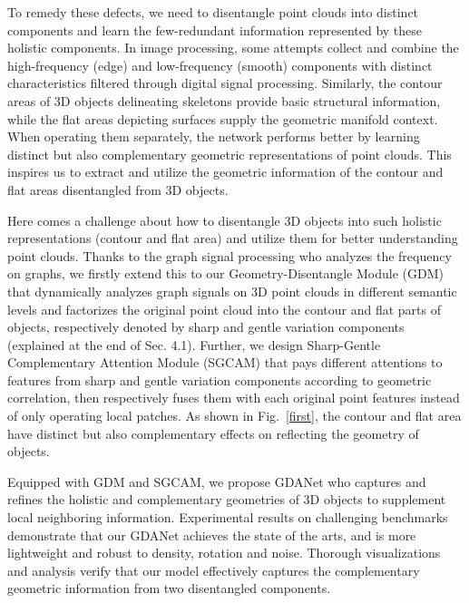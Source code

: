\documentclass[letterpaper]{article} \usepackage{aaai21}  \usepackage{times}  \usepackage{helvet} \usepackage{courier}  \usepackage[hyphens]{url}  \usepackage{graphicx} \urlstyle{rm} \def\UrlFont{\rm}  \usepackage{natbib}  \usepackage{caption} \frenchspacing  \setlength{\pdfpagewidth}{8.5in}  \setlength{\pdfpageheight}{11in}  \usepackage{color}
\begin{document}
To remedy these defects, we need to disentangle point clouds into distinct components and learn the few-redundant information represented by these holistic components. In image processing, some attempts collect and combine the high-frequency (edge) and low-frequency (smooth) components with distinct characteristics filtered through digital signal processing. Similarly, the contour areas of 3D objects delineating skeletons provide basic structural information, while the flat areas depicting surfaces supply the geometric manifold context. When operating them separately, the network performs better by learning distinct but also complementary geometric representations of point clouds. This inspires us to extract and utilize the geometric information of the contour and flat areas disentangled from 3D objects.


Here comes a challenge about how to disentangle 3D objects into such holistic representations (contour and flat area) and utilize them for better understanding point clouds. Thanks to the graph signal processing \cite{graphsignal,discrete} who analyzes the frequency on graphs, we firstly extend this to our Geometry-Disentangle Module (GDM) that dynamically analyzes graph signals on 3D point clouds in different semantic levels and factorizes the original point cloud into the contour and flat parts of objects, respectively denoted by sharp and gentle variation components (explained at the end of Sec. 4.1). Further, we design Sharp-Gentle Complementary Attention Module (SGCAM) that pays different attentions to features from sharp and gentle variation components according to geometric correlation, then respectively fuses them with each original point features instead of only operating local patches. As shown in Fig.~\ref{first}, the contour and flat area have distinct but also complementary effects on reflecting the geometry of objects. 

Equipped with GDM and SGCAM, we propose GDANet who captures and refines the holistic and complementary geometries of 3D objects to supplement local neighboring information. Experimental results on challenging benchmarks demonstrate that our GDANet achieves the state of the arts, and is more lightweight and robust to density, rotation and noise. Thorough visualizations and analysis verify that our model effectively captures the complementary geometric information from two disentangled components.
\end{document}
